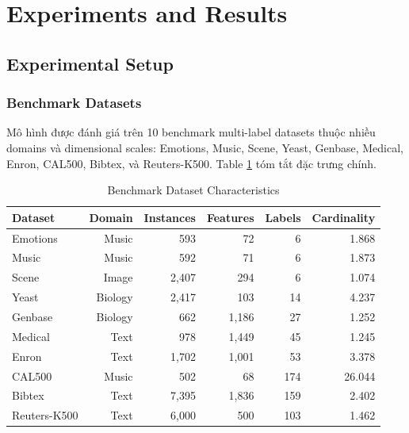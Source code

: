 \documentclass[conference]{IEEEtran}
\begin{document}
\section{Experiments and Results}

\subsection{Experimental Setup}
\subsubsection{Benchmark Datasets}
Mô hình được đánh giá trên 10 benchmark multi-label datasets thuộc nhiều domains và dimensional scales: Emotions, Music, Scene, Yeast, Genbase, Medical, Enron, CAL500, Bibtex, và Reuters-K500. Table \ref{tab:datasets_vi} tóm tắt đặc trưng chính.

\begin{table}[htbp]
\caption{Benchmark Dataset Characteristics}
\label{tab:datasets_vi}
\centering
\begin{tabular}{lrrrrr}
\toprule
\textbf{Dataset} & \textbf{Domain} & \textbf{Instances} & \textbf{Features} & \textbf{Labels} & \textbf{Cardinality} \\
\midrule
Emotions & Music & 593 & 72 & 6 & 1.868 \\
Music & Music & 592 & 71 & 6 & 1.873 \\
Scene & Image & 2,407 & 294 & 6 & 1.074 \\
Yeast & Biology & 2,417 & 103 & 14 & 4.237 \\
Genbase & Biology & 662 & 1,186 & 27 & 1.252 \\
Medical & Text & 978 & 1,449 & 45 & 1.245 \\
Enron & Text & 1,702 & 1,001 & 53 & 3.378 \\
CAL500 & Music & 502 & 68 & 174 & 26.044 \\
Bibtex & Text & 7,395 & 1,836 & 159 & 2.402 \\
Reuters-K500 & Text & 6,000 & 500 & 103 & 1.462 \\
\bottomrule
\end{tabular}
\end{table}
\end{document}
